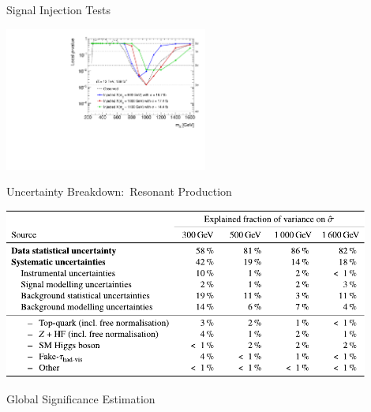 \documentclass[11pt, xcolor={dvipsnames}, aspectratio=169, notes]{beamer}
\begin{document}
\begin{frame}{Signal Injection Tests}
  \centering

  \includegraphics[width=0.5\textwidth]{results_res/injection}
\end{frame}


\begin{frame}{Uncertainty Breakdown:\ Resonant  Production}
  \centering

  \includegraphics[width=0.9\textwidth]{backup/uncertainty_breakdown_resonant}
\end{frame}


\begin{frame}[standout]
  Global Significance Estimation
\end{frame}

\end{document}
